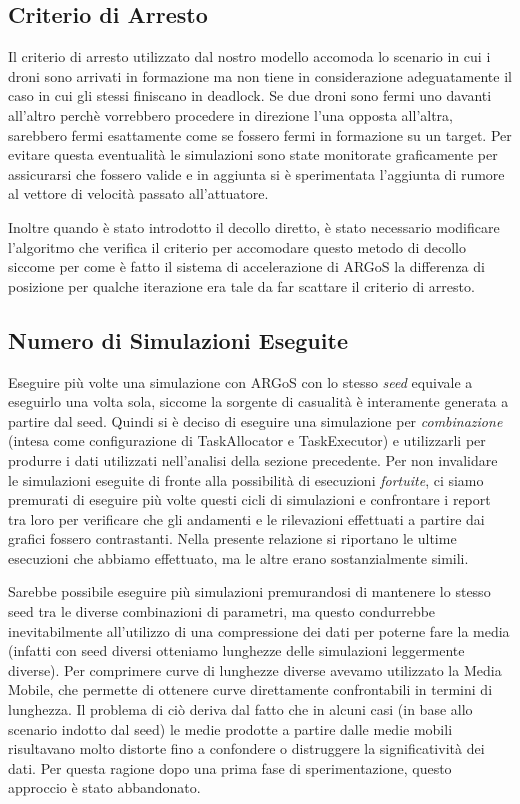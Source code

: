 \documentclass[a4paper,11pt,oneside, table]{article}
\begin{document}
\subsection{Criterio di Arresto}

Il criterio di arresto utilizzato dal nostro modello accomoda lo scenario in cui i droni sono arrivati in formazione ma non tiene in considerazione adeguatamente il caso in cui gli stessi finiscano in deadlock.
Se due droni sono fermi uno davanti all'altro perch\`e vorrebbero procedere in direzione l'una opposta all'altra, sarebbero fermi esattamente come se fossero fermi in formazione su un target.
Per evitare questa eventualit\`a le simulazioni sono state monitorate graficamente per assicurarsi che fossero valide e in aggiunta si \`e sperimentata l'aggiunta di rumore al vettore di velocit\`a passato all'attuatore.

Inoltre quando \`e stato introdotto il decollo diretto, \`e stato necessario modificare l'algoritmo che verifica il criterio per accomodare questo metodo di decollo siccome per come \`e fatto il sistema di accelerazione di ARGoS la differenza di posizione per qualche iterazione era tale da far scattare il criterio di arresto.

\subsection{Numero di Simulazioni Eseguite}

Eseguire pi\`u volte una simulazione con ARGoS con lo stesso \textit{seed} equivale a eseguirlo una volta sola, siccome la sorgente di casualit\`a \`e interamente generata a partire dal seed.
Quindi si \`e deciso di eseguire una simulazione per \textit{combinazione} (intesa come configurazione di TaskAllocator e TaskExecutor) e utilizzarli per produrre i dati utilizzati nell'analisi della sezione precedente.
Per non invalidare le simulazioni eseguite di fronte alla possibilit\`a di esecuzioni \textit{fortuite}, ci siamo premurati di eseguire pi\`u volte questi cicli di simulazioni e confrontare i report tra loro per verificare che gli andamenti e le rilevazioni effettuati a partire dai grafici fossero contrastanti.
Nella presente relazione si riportano le ultime esecuzioni che abbiamo effettuato, ma le altre erano sostanzialmente simili.

Sarebbe possibile eseguire pi\`u simulazioni premurandosi di mantenere lo stesso seed tra le diverse combinazioni di parametri, ma questo condurrebbe inevitabilmente all'utilizzo di una compressione dei dati per poterne fare la media (infatti con seed diversi otteniamo lunghezze delle simulazioni leggermente diverse).
Per comprimere curve di lunghezze diverse avevamo utilizzato la Media Mobile, che permette di ottenere curve direttamente confrontabili in termini di lunghezza. Il problema di ci\`o deriva dal fatto che in alcuni casi (in base allo scenario indotto dal seed) le medie prodotte a partire dalle medie mobili risultavano molto distorte fino a confondere o distruggere la significativit\`a dei dati.
Per questa ragione dopo una prima fase di sperimentazione, questo approccio \`e stato abbandonato.
\end{document}
